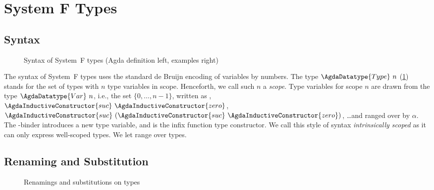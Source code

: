 \documentclass[manuscript,screen,review,anonymous,acmsmall]{acmart}
\begin{document}
\section{System F Types}
\label{sec:system-f}

\subsection{Syntax}
\label{sec:types}
\begin{figure}[t]
\begin{minipage}[t]{0.49\linewidth}
  \SFTypeDefinition
\end{minipage}
\begin{minipage}[t]{0.49\linewidth}
  \SFTypeExample
\end{minipage}
  \caption{Syntax of System~F types (Agda definition left, examples right)}
  \label{fig:system-f-types}
\end{figure}
The syntax of System~F types uses the standard de Bruijn encoding of
variables by numbers. The type
$\AgdaDatatype{Type}~n$  (\cref{fig:system-f-types}) stands for the 
set of types with $n$ type variables in scope. Henceforth, we call
such $n$  a \emph{scope}.
Type variables for scope $n$ are drawn from the type $\AgdaDatatype{Var}\ n$, i.e.,
the set $\{0,\dots, n-1\}$, written as
,
$\AgdaInductiveConstructor{suc}~\AgdaInductiveConstructor{zero}$,
$\AgdaInductiveConstructor{suc}~(\AgdaInductiveConstructor{suc}~\AgdaInductiveConstructor{zero})$,
\dots and ranged over by {$\alpha$}.
The  \AgdaInductiveConstructor{$\forall\alpha$}-binder introduces a new type
variable, and \AgdaInductiveConstructor{$\Rightarrow$} is the infix
function type constructor. We call this style of syntax \emph{intrinsically scoped} as it
can only express well-scoped types. We let  range over types.

\subsection{Renaming and Substitution}
\label{sec:renam-subst}
\begin{figure}[tp]
  \begin{minipage}[t]{0.49\linewidth}
    \SFTypeRenaming
    \SFTypeRenamingOpaque
  \end{minipage}
  \begin{minipage}[t]{0.49\linewidth}
    \SFTypeSubstitution
    \SFTypeSubstitutionOpaque
  \end{minipage}
  \caption{Renamings and substitutions on types}
  \label{fig:system-f-ren-sub}
\end{figure}
\end{document}

